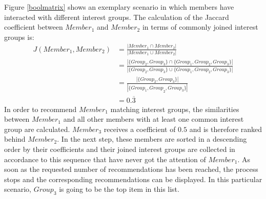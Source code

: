 \documentclass[12pt,numbers=noenddot,parskip,bibliography=totocnumbered,listof=totocnumbered,draft]{scrreprt}
\begin{document}
Figure \ref{boolmatrix} shows an exemplary scenario in which members have interacted with different interest groups. The calculation of the Jaccard coefficient between $\mathit{Member}_1$ and $\mathit{Member}_2$ in terms of commonly joined interest groups is:
\begin{align*}
J(\mathit{Member}_1, \mathit{Member}_2) &= \frac{|\mathit{Member}_1 \cap \mathit{Member}_2|}{|\mathit{Member}_1 \cup \mathit{Member}_2|} \\ &= \frac{|\{\mathit{Group}_2, \mathit{Group}_3\} \cap \{\mathit{Group}_1, \mathit{Group}_2, \mathit{Group}_3\}|}{|\{\mathit{Group}_2, \mathit{Group}_3\} \cup \{\mathit{Group}_1, \mathit{Group}_2, \mathit{Group}_3\}|} \\ &= \frac{|\{\mathit{Group}_2, \mathit{Group}_3\}|}{|\{\mathit{\mathit{Group}_1, Group}_2, \mathit{Group}_3\}|} \\ &= 0.\overline{3}
\end{align*}
In order to recommend $\mathit{Member}_1$ matching interest groups, the similarities between $\mathit{Member}_1$ and all other members with at least one common interest group are calculated. $\mathit{Member}_3$ receives a coefficient of $0.5$ and is therefore ranked behind $\mathit{Member}_2$. In the next step, these members are sorted in a descending order by their coefficients and their joined interest groups are collected in accordance to this sequence that have never got the attention of $\mathit{Member}_1$. As soon as the requested number of recommendations has been reached, the process stops and the corresponding recommendations can be displayed. In this particular scenario, $\mathit{Group}_3$ is going to be the top item in this list.
\end{document}
